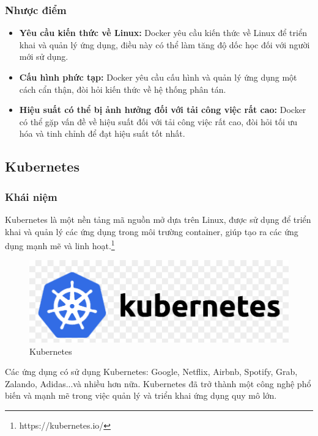 \subsubsection{Nhược điểm}
\begin{itemize}
  \item \textbf{Yêu cầu kiến thức về Linux:} Docker yêu cầu kiến thức về Linux để triển khai và quản lý ứng dụng, điều này có thể làm tăng độ dốc học đối với người mới sử dụng.
  \item \textbf{Cấu hình phức tạp:} Docker yêu cầu cấu hình và quản lý ứng dụng một cách cẩn thận, đòi hỏi kiến thức về hệ thống phân tán.
  \item \textbf{Hiệu suất có thể bị ảnh hưởng đối với tải công việc rất cao:} Docker có thể gặp vấn đề về hiệu suất đối với tải công việc rất cao, đòi hỏi tối ưu hóa và tinh chỉnh để đạt hiệu suất tốt nhất.
\end{itemize}
\subsection{Kubernetes}
\subsubsection{Khái niệm}
\noindent Kubernetes là một nền tảng mã nguồn mở dựa trên Linux, được sử dụng để triển khai và quản lý các ứng dụng trong môi trường container, giúp tạo ra các ứng dụng mạnh mẽ và linh hoạt.\footnote{https://kubernetes.io/}
\begin{figure}[H]
  \begin{center}
    \includegraphics[scale=0.3]{images/hieu/phuluc/kubernetes.png}
    \caption{Kubernetes}
  \end{center}
\end{figure}
\noindent Các ứng dụng có sử dụng Kubernetes: Google, Netflix, Airbnb, Spotify, Grab, Zalando, Adidas...và nhiều hơn nữa. Kubernetes đã trở thành một công nghệ phổ biến và mạnh mẽ trong việc quản lý và triển khai ứng dụng quy mô lớn.
